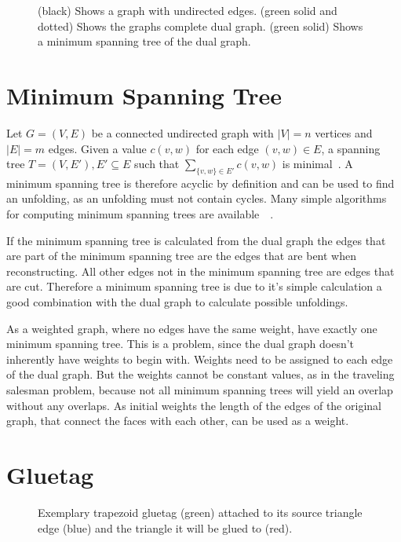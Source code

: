 \documentclass[draft,final]{vutinfth} %
\begin{document}
\begin{figure}

\caption{(black) Shows a graph with undirected edges. (green solid and dotted) Shows the graphs complete dual graph. (green solid) Shows a minimum spanning tree of the dual graph.}
\label{fig:dualgraph}
\end{figure}

\section{Minimum Spanning Tree}

Let $G = (V,E)$ be a connected undirected graph with $|V| = n$ vertices and $|E| = m$ edges. Given a value $c(v,w)$ for each edge $(v,w) \in E$, a spanning tree $T = (V,E'), E' \subseteq E$ such that $\sum_{\{v,w\}\in E'} c(v,w)$ is minimal~\cite{cheriton1976finding}. A minimum spanning tree is therefore acyclic by definition and can be used to find an unfolding, as an unfolding must not contain cycles. Many simple algorithms for computing minimum spanning trees are available~\cite{kruskal1956shortest}~\cite{ahuja1990faster}. 

If the minimum spanning tree is calculated from the dual graph the edges that are part of the minimum spanning tree are the edges that are bent when reconstructing. All other edges not in the minimum spanning tree are edges that are cut. Therefore a minimum spanning tree is due to it's simple calculation a good combination with the dual graph to calculate possible unfoldings. 

As a weighted graph, where no edges have the same weight, have exactly one minimum spanning tree. This is a problem, since the dual graph doesn't inherently have weights to begin with. Weights need to be assigned to each edge of the dual graph. But the weights cannot be constant values, as in the traveling salesman problem, because not all minimum spanning trees will yield an overlap without any overlaps. 
As initial weights the length of the edges of the original graph, that connect the faces with each other, can be used as a weight.

\section{Gluetag}
\begin{figure}

\caption{Exemplary trapezoid gluetag (green) attached to its source triangle edge (blue) and the triangle it will be glued to (red).}
\label{fig:gluetag}
\end{figure}
\end{document}

